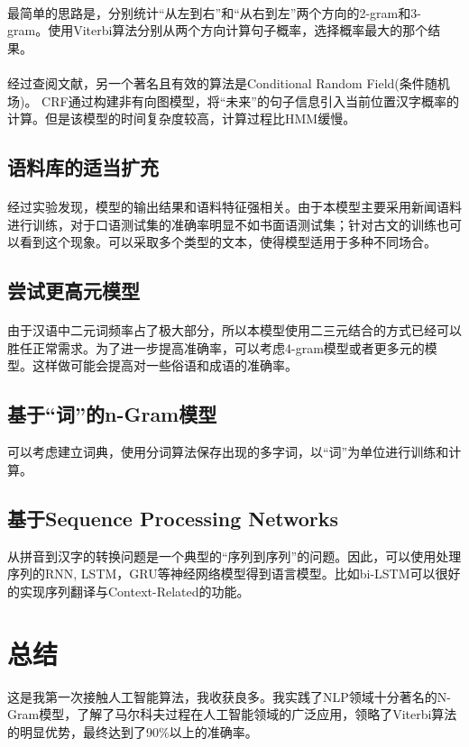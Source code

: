 \documentclass[UTF8, onecolumn, a4paper]{article}
\begin{document}
\paragraph*{}
最简单的思路是，分别统计“从左到右”和“从右到左”两个方向的2-gram和3-gram。使用Viterbi算法分别从两个方向计算句子概率，选择概率最大的那个结果。
\paragraph*{}
经过查阅文献，另一个著名且有效的算法是Conditional Random Field(条件随机场)。
CRF通过构建非有向图模型，将“未来”的句子信息引入当前位置汉字概率的计算。但是该模型的时间复杂度较高，计算过程比HMM缓慢。
\subsection{语料库的适当扩充}
\paragraph*{}
经过实验发现，模型的输出结果和语料特征强相关。由于本模型主要采用新闻语料进行训练，对于口语测试集的准确率明显不如书面语测试集；针对古文的训练也可以看到这个现象。可以采取多个类型的文本，使得模型适用于多种不同场合。
\subsection{尝试更高元模型}
\paragraph*{}
由于汉语中二元词频率占了极大部分，所以本模型使用二三元结合的方式已经可以胜任正常需求。为了进一步提高准确率，可以考虑4-gram模型或者更多元的模型。这样做可能会提高对一些俗语和成语的准确率。
\subsection{基于“词”的n-Gram模型}
可以考虑建立词典，使用分词算法保存出现的多字词，以“词”为单位进行训练和计算。
\subsection{基于Sequence Processing Networks}
从拼音到汉字的转换问题是一个典型的“序列到序列”的问题。因此，可以使用处理序列的RNN, LSTM，GRU等神经网络模型得到语言模型。比如bi-LSTM可以很好的实现序列翻译与Context-Related的功能。
\section{总结}
这是我第一次接触人工智能算法，我收获良多。我实践了NLP领域十分著名的N-Gram模型，了解了马尔科夫过程在人工智能领域的广泛应用，领略了Viterbi算法的明显优势，最终达到了90\%以上的准确率。
\end{document}
